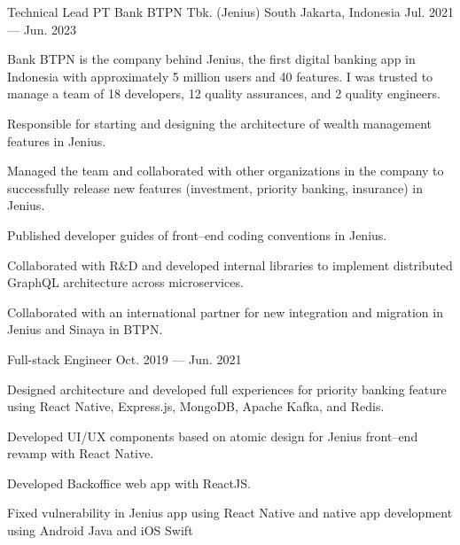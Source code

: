\begin{cventries}
  \cventry
    {Technical Lead}
    {PT Bank BTPN Tbk. (Jenius)}
    {South Jakarta, Indonesia}
    {Jul. 2021 --- Jun. 2023}
    {
      \begin{cvitems}
        \item {Bank BTPN is the company behind Jenius, the first digital banking app in Indonesia with approximately 5 million users and 40 features. 
        I was trusted to manage a team of 18 developers, 12 quality assurances, and 2 quality engineers.}
        \item {Responsible for starting and designing the architecture of wealth management features in Jenius.}
        \item {Managed the team and collaborated with other organizations in the company to successfully release new features (investment, priority banking, insurance) in Jenius.}
        \item {Published developer guides of front--end coding conventions in Jenius.}
        \item {Collaborated with R\&D and developed internal libraries to implement distributed GraphQL architecture across microservices.}
        \item {Collaborated with an international partner for new integration and migration in Jenius and Sinaya in BTPN.}
      \end{cvitems}
    }

  \cventry
    {Full-stack Engineer} %
    {} %
    {} %
    {Oct. 2019 --- Jun. 2021} %
    {
      \begin{cvitems} %
        \item {Designed architecture and developed full experiences for priority banking feature using React Native, Express.js, MongoDB, Apache Kafka, and Redis.}
        \item {Developed UI/UX components based on atomic design for Jenius front--end revamp with React Native.}
        \item {Developed Backoffice web app with ReactJS.}
        \item {Fixed vulnerability in Jenius app using React Native and native app development using Android Java and iOS Swift}
      \end{cvitems}
    }


\end{cventries}
